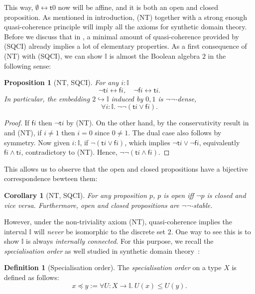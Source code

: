 \documentclass[12pt]{amsart}
\newtheorem{corollary}[theorem]{Corollary}
\newtheorem{proposition}[theorem]{Proposition}
\theoremstyle{definition}
\newtheorem{definition}[theorem]{Definition}
\newcommand{\mbb}[1]{\mathbb{#1}}
\newcommand{\I}{\mbb I}
\newcommand{\ms}[1]{\mathsf{#1}}
\newcommand{\hook}{\hookrightarrow}
\newcommand{\dneg}{\neg\neg}
\newcommand{\fa}[2]{\forall #1\!\colon\!\!#2.\ }
\newcommand{\emp}{\emptyset}
\newcommand{\eq}{\leftrightarrow}
\begin{document}
This way, $\emp \eq \ms t0$ now will be affine, and it is both an open and closed proposition. As mentioned in introduction, (NT) together with a strong enough quasi-coherence principle will imply all the axioms for synthetic domain theory. Before we discuss that in , a minimal amount of quasi-coherence provided by (SQCI) already implies a lot of elementary properties. As a first consequence of (NT) with (SQCI), we can show $\I$ is almost the Boolean algebra $2$ in the following sense:

\begin{proposition}[NT, SQCI]\label{prop:filed}
  For any $i : \I$ 
  \[ \neg \ms ti \eq \ms fi, \quad \neg\ms fi \eq \ms ti. \]
  In particular, the embedding $2 \hook \I$ induced by $0,1$ is $\neg\neg$-dense,
  \[ \fa i\I \dneg(\ms ti \vee \ms fi). \]
\end{proposition}
\begin{proof}
  If $\ms fi$ then $\neg\ms ti$ by (NT). On the other hand, by the conservativity result in  and (NT), if $i \neq 1$ then $i = 0$ since $0 \neq 1$. The dual case also follows by symmetry. Now given $i :\I$, if $\neg(\ms ti \vee \ms fi)$, which implies $\neg\ms ti \vee \neg\ms fi$, equivalently $\ms fi \wedge \ms ti$, contradictory to (NT). Hence, $\neg\neg(\ms ti \wedge \ms fi)$.
\end{proof}

This allows us to observe that the open and closed propositions have a bijective correspondence bewteen them:

\begin{corollary}[NT, SQCI]\label{cor:opendnegclose}
  For any proposition $p$, $p$ is open iff $\neg p$ is closed and vice versa. Furthermore, open and closed propositions are $\dneg$-stable.
\end{corollary}

However, under the non-triviality axiom (NT), quasi-coherence implies the interval $\I$ will \emph{never} be isomorphic to the discrete set $2$. One way to see this is to show $\I$ is always \emph{internally connected}. For this purpose, we recall the \emph{specialisation order} as well studied in synthetic domain theory~\cite{PhoaWesleyKym-Son1991DtiR}:

\begin{definition}[Specialisation order]\label{defn:specialisation}
  The \emph{specialisation order} on a type $X$ is defined as follows:
  \[ x \preceq y := \fa{U}{X\to\I} U(x) \le U(y). \]
\end{definition}
\end{document}
